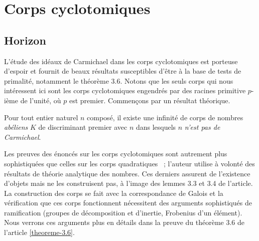 \section{Corps cyclotomiques}

\subsection{Horizon}

L'étude des idéaux de Carmichael dans les corps cyclotomiques est porteuse d'espoir et fournit de beaux résultats susceptibles d'être à la base de tests de primalité, notamment le théorème 3.6. Notons que les seuls corps qui nous intéressent ici sont les corps cyclotomiques engendrés par des racines primitive $p$-ième de l'unité, où $p$ est premier. Commençons par un résultat théorique.

\begin{theoreme}
	Pour tout entier naturel $n$ composé, il existe une infinité de corps de nombres \emph{abéliens} $K$ de discriminant premier avec $n$ dans lesquels $n$ \emph{n'est pas de Carmichael}.
\end{theoreme}

\begin{MotSurPreuve}
	Les preuves des énoncés sur les corps cyclotomiques sont autrement plus sophistiquées que celles sur les corps quadratiques ~; l'auteur utilise à volonté des résultats de théorie analytique des nombres. Ces derniers assurent de l'existence d'objets mais ne les construisent pas, à l'image des lemmes 3.3 et 3.4 de l'article. La construction des corps se fait avec la correspondance de Galois et la vérification que ces corps fonctionnent nécessitent des arguments sophistiqués de ramification (groupes de décomposition et d'inertie, Frobenius d'un élément). Nous verrons ces arguments plus en détails dans la preuve du théorème 3.6 de l'article \ref{theoreme-3.6}. \\
\end{MotSurPreuve}

